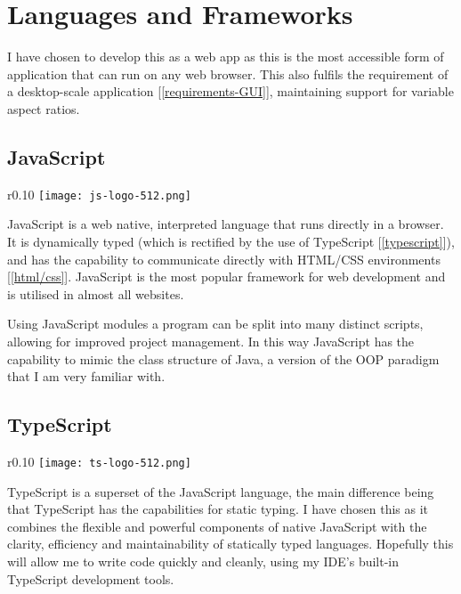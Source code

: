 \section{Languages and Frameworks}

    I have chosen to develop this as a web app as this is the most accessible form of application that can run on any web browser. This also fulfils the requirement of a desktop-scale application [\autoref{requirements-GUI}], maintaining support for variable aspect ratios.

    \subsection{JavaScript}

        \begin{wrapfigure}{r}{0.10\textwidth}
            \centering
            \texttt{[image: js-logo-512.png]}
        \end{wrapfigure}

        JavaScript is a web native, interpreted language that runs directly in a browser. It is dynamically typed (which is rectified by the use of TypeScript [\autoref{typescript}]), and has the capability to communicate directly with HTML/CSS environments [\autoref{html/css}]. JavaScript is the most popular framework for web development and is utilised in almost all websites.

        Using JavaScript modules a program can be split into many distinct scripts, allowing for improved project management. In this way JavaScript has the capability to mimic the class structure of Java, a version of the OOP paradigm that I am very familiar with.

    \subsection{TypeScript}
    \label{typescript}

        \begin{wrapfigure}{r}{0.10\textwidth}
            \centering
            \texttt{[image: ts-logo-512.png]}
        \end{wrapfigure}

        TypeScript \cite{typescript} is a superset of the JavaScript language, the main difference being that TypeScript has the capabilities for static typing. I have chosen this as it combines the flexible and powerful components of native JavaScript with the clarity, efficiency and maintainability of statically typed languages. Hopefully this will allow me to write code quickly and cleanly, using my IDE's built-in TypeScript development tools.

